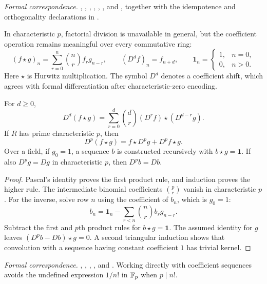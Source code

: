 \begingroup\small\raggedright
\noindent\emph{Formal correspondence.}
, ,
, ,
, ,
and , together with the idempotence and
orthogonality declarations in .
\par\endgroup

In characteristic $p$, factorial division is unavailable in general, but the
coefficient operation remains meaningful over every commutative ring:
\[
(f\star g)_n=\sum_{r=0}^{n}\binom nr f_r g_{n-r},\qquad
(D^d f)_n=f_{n+d},\qquad \mathbf1_n=\begin{cases}1,&n=0,\\0,&n>0.\end{cases}
\]
Here $\star$ is Hurwitz multiplication. The symbol $D^d$ denotes a coefficient
shift, which agrees with formal differentiation after characteristic-zero
encoding.

\begin{theorem}
\label{thm:hurwitz-product}
For $d\geq0$,
\[
D^d(f\star g)=\sum_{r=0}^{d}\binom dr(D^r f)\star(D^{d-r}g).
\]
If $R$ has prime characteristic $p$, then
\[
D^p(f\star g)=f\star D^p g+D^p f\star g.
\]
Over a field, if $g_0=1$, a sequence $b$ is constructed recursively with
$b\star g=\mathbf1$. If also $D^p g=Dg$ in characteristic $p$, then
$D^p b=Db$.
\end{theorem}

\begin{proof}
Pascal's identity proves the first product rule, and induction proves the
higher rule. The intermediate binomial coefficients $\binom pr$ vanish in
characteristic $p$. For the inverse, solve row $n$ using the coefficient of
$b_n$, which is $g_0=1$:
\[
b_n=\mathbf1_n-\sum_{r<n}\binom nr b_r g_{n-r}.
\]
Subtract the first and $p$th product rules for $b\star g=\mathbf1$.
The assumed identity for $g$ leaves
$(D^p b-Db)\star g=0$. A second triangular induction shows that convolution
with a sequence having constant coefficient $1$ has trivial kernel.
\end{proof}

\begingroup\small\raggedright
\noindent\emph{Formal correspondence.}
, ,
,
, and
.
Working directly with coefficient sequences avoids the undefined expression
$1/n!$ in $\mathbb F_p$ when $p\mid n!$.
\par\endgroup


